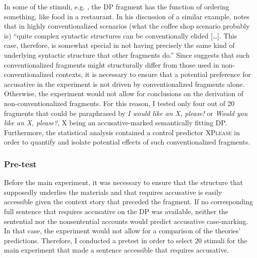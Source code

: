 In some of the stimuli, e.g. \Last, the DP fragment has the function of ordering something, like food in a restaurant. In his discussion of a similar example, \citet[731]{merchant2004} notes that in highly conventionalized scenarios (what the coffee shop scenario probably is) ``quite complex syntactic structures can be conventionally elided [\dots]. This case, therefore, is somewhat special in not having precisely the same kind of underlying syntactic structure that other fragments do.'' Since \citeauthor{merchant2004} suggests that such conventionalized fragments might structurally differ from those used in non-conventionalized contexts, it is necessary to ensure that a potential preference for accusative in the experiment is not driven by conventionalized fragments alone. Otherwise, the experiment would not allow for conclusions on the derivation of non-conventionalized fragments. For this reason, I tested only four out of 20 fragments that could be paraphrased by \textit{I would like an X, please!} or \textit{Would you like an X, please?}, X being an accusative-marked semantically fitting DP. Furthermore, the statistical analysis contained a control predictor \textsc{XPlease} in order to quantify and isolate potential effects of such conventionalized fragments.

\subsubsection{Pre-test}
\label{sec:case-pretest}

Before the main experiment, it was necessary to ensure that the structure that supposedly underlies the materials and that requires accusative is easily accessible given the context story that preceded the fragment. If no corresponding full sentence that requires accusative on the DP was available, neither the sentential nor the nonsentential accounts would predict accusative case-marking. In that case, the experiment would not allow for a comparison of the theories' predictions. Therefore, I conducted a pretest in order to select 20 stimuli for the main experiment that made a sentence accessible that requires accusative.

